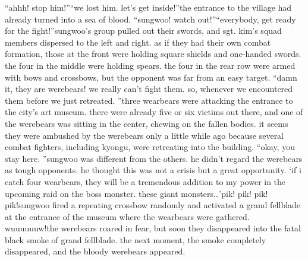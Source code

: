 “ahhh! stop him!”“we lost him.
 let’s get inside!”the entrance to the village had already turned into a sea of blood.
“sungwoo! watch out!”“everybody, get ready for the fight!”sungwoo’s group pulled out their swords, and sgt.
 kim’s squad members dispersed to the left and right.
 as if they had their own combat formation, those at the front were holding square shields and one-handed swords.
 the four in the middle were holding spears.
 the four in the rear row were armed with bows and crossbows, but the opponent was far from an easy target.
“damn it, they are werebears! we really can’t fight them.
 so, whenever we encountered them before we just retreated.
”three wearbears were attacking the entrance to the city’s art museum.
 there were already five or six victims out there, and one of the werebears was sitting in the center, chewing on the fallen bodies.
it seems they were ambushed by the werebears only a little while ago because several combat fighters, including kyongu, were retreating into the building.
“okay, you stay here.
”sungwoo was different from the others.
 he didn’t regard the werebears as tough opponents.
 he thought this was not a crisis but a great opportunity.
‘if i catch four wearbears, they will be a tremendous addition to my power in the upcoming raid on the boss monster.
 these giant monsters…’pik! pik! pik! pik!sungwoo fired a repeating crossbow randomly and activated a grand fellblade at the entrance of the museum where the wearbears were gathered.
wuuuuuuw!the werebears roared in fear, but soon they disappeared into the fatal black smoke of grand fellblade.
 the next moment, the smoke completely disappeared, and the bloody werebears appeared.

